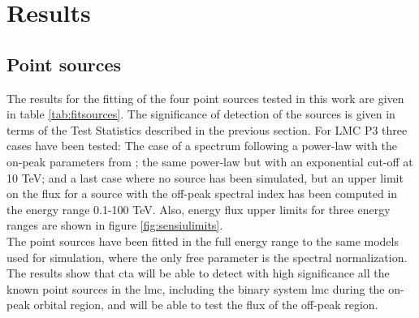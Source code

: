\documentclass{article}
\begin{document}
\section{Results}\label{sec:results}
        
\subsection{Point sources}

The results for the fitting of the four point sources tested in this work are given in table \ref{tab:fitsources}. The significance of detection of the sources is given in terms of the Test Statistics described in the previous section. For LMC P3 three cases have been tested: The case of a spectrum following a power-law with the on-peak parameters from \cite{2017HESSLMCP3}; the same power-law but with an exponential cut-off at 10 TeV; and a last case where no source has been simulated, but an upper limit on the flux for a source with the off-peak spectral index has been computed in the energy range 0.1-100 TeV. Also, energy flux upper limits for three energy ranges are shown in figure \ref{fig:sensiulimits}.\\
The point sources have been fitted in the full energy range to the same models used for simulation, where the only free parameter is the spectral normalization.
The results show that \gls{cta} will be able to detect with high significance all the known point sources in the \gls{lmc}, including the binary system \gls{lmc} during the on-peak orbital region, and will be able to test the flux of the off-peak region. 
\end{document}
